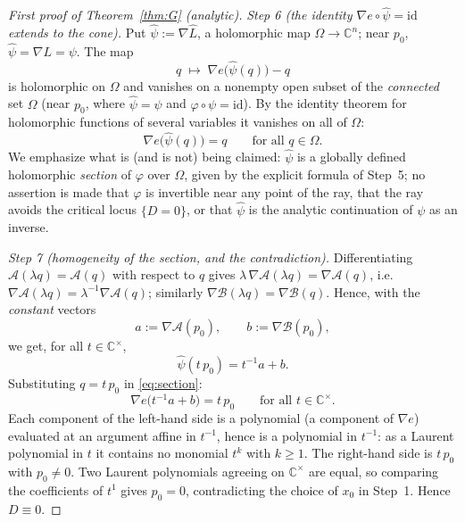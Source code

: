 \documentclass[11pt]{article}
\theoremstyle{plain}
\theoremstyle{definition}
\newcommand{\C}{\mathbb{C}}
\begin{document}
\begin{proof}[First proof of Theorem~\ref{thm:G} (analytic)]
\emph{Step 6 (the identity $\nabla e\circ\widehat\psi=\mathrm{id}$
extends to the cone).} Put $\widehat\psi:=\nabla\widehat L$, a
holomorphic map $\Omega\to\C^n$; near $p_0$,
$\widehat\psi=\nabla L=\psi$. The map
\[
q\;\longmapsto\;\nabla e\bigl(\widehat\psi(q)\bigr)-q
\]
is holomorphic on $\Omega$ and vanishes on a nonempty open subset of the
\emph{connected} set $\Omega$ (near $p_0$, where $\widehat\psi=\psi$ and
$\varphi\circ\psi=\mathrm{id}$). By the identity theorem for holomorphic
functions of several variables it vanishes on all of $\Omega$:
\begin{equation}\label{eq:section}
\nabla e\bigl(\widehat\psi(q)\bigr)=q\qquad\text{for all }q\in\Omega .
\end{equation}
We emphasize what is (and is not) being claimed: $\widehat\psi$ is a
globally defined holomorphic \emph{section} of $\varphi$ over $\Omega$,
given by the explicit formula of Step~5; no assertion is made that
$\varphi$ is invertible near any point of the ray, that the ray avoids
the critical locus $\{D=0\}$, or that $\widehat\psi$ is the analytic
continuation of $\psi$ as an inverse.

\emph{Step 7 (homogeneity of the section, and the contradiction).}
Differentiating $\mathcal A(\lambda q)=\mathcal A(q)$ with respect to $q$
gives $\lambda\,\nabla\mathcal A(\lambda q)=\nabla\mathcal A(q)$, i.e.\
$\nabla\mathcal A(\lambda q)=\lambda^{-1}\nabla\mathcal A(q)$; similarly
$\nabla\mathcal B(\lambda q)=\nabla\mathcal B(q)$. Hence, with the
\emph{constant} vectors
\[
a:=\nabla\mathcal A(p_0),\qquad b:=\nabla\mathcal B(p_0),
\]
we get, for all $t\in\C^{\times}$,
\[
\widehat\psi(t\,p_0)=t^{-1}a+b .
\]
Substituting $q=t\,p_0$ in \eqref{eq:section}:
\[
\nabla e\bigl(t^{-1}a+b\bigr)=t\,p_0
\qquad\text{for all }t\in\C^{\times}.
\]
Each component of the left-hand side is a polynomial (a component of
$\nabla e$) evaluated at an argument affine in $t^{-1}$, hence is a
polynomial in $t^{-1}$: as a Laurent polynomial in $t$ it contains no
monomial $t^k$ with $k\ge1$. The right-hand side is $t\,p_0$ with
$p_0\ne0$. Two Laurent polynomials agreeing on $\C^{\times}$ are equal,
so comparing the coefficients of $t^{1}$ gives $p_0=0$, contradicting the
choice of $x_0$ in Step~1. Hence $D\equiv0$.
\end{proof}
\end{document}
